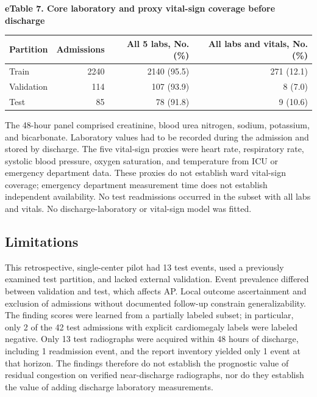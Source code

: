 \noindent\textbf{eTable 7. Core laboratory and proxy vital-sign coverage before discharge}\par
\begin{longtable}{@{}lrrr@{}}
\toprule
Partition & Admissions & All 5 labs, No. (\%) & All labs and vitals, No. (\%) \\
\midrule
\endhead
Train & 2240 & 2140 (95.5) & 271 (12.1) \\
Validation & 114 & 107 (93.9) & 8 (7.0) \\
Test & 85 & 78 (91.8) & 9 (10.6) \\
\bottomrule
\end{longtable}
\noindent The 48-hour panel comprised creatinine, blood urea nitrogen, sodium, potassium, and bicarbonate. Laboratory values had to be recorded during the admission and stored by discharge. The five vital-sign proxies were heart rate, respiratory rate, systolic blood pressure, oxygen saturation, and temperature from ICU or emergency department data. These proxies do not establish ward vital-sign coverage; emergency department measurement time does not establish independent availability. No test readmissions occurred in the subset with all labs and vitals. No discharge-laboratory or vital-sign model was fitted.

\endgroup

\subsection*{Limitations}
This retrospective, single-center pilot had 13 test events, used a previously examined test partition, and lacked external validation. Event prevalence differed between validation and test, which affects AP. Local outcome ascertainment and exclusion of admissions without documented follow-up constrain generalizability. The finding scores were learned from a partially labeled subset; in particular, only 2 of the 42 test admissions with explicit cardiomegaly labels were labeled negative. Only 13 test radiographs were acquired within 48 hours of discharge, including 1 readmission event, and the report inventory yielded only 1 event at that horizon. The findings therefore do not establish the prognostic value of residual congestion on verified near-discharge radiographs, nor do they establish the value of adding discharge laboratory measurements.
